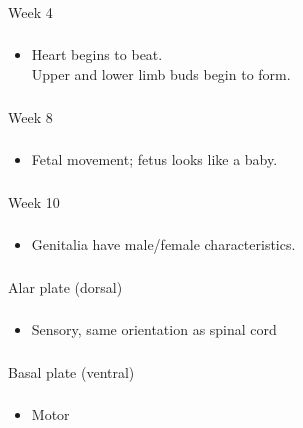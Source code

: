 \documentclass[11pt]{beamer}
\begin{document}
\begin{frame}
 \frametitle{}
Week 4
\end{frame}

\begin{frame}
 \frametitle{}
\begin{itemize}
\item{Heart begins to beat. \\ Upper and lower limb buds begin to form.}
\end{itemize}
\end{frame}

\begin{frame}
 \frametitle{}
Week 8
\end{frame}

\begin{frame}
 \frametitle{}
\begin{itemize}
\item{Fetal movement; fetus looks like a baby.}
\end{itemize}
\end{frame}

\begin{frame}
 \frametitle{}
Week 10
\end{frame}

\begin{frame}
 \frametitle{}
\begin{itemize}
\item{Genitalia have male/female characteristics.}
\end{itemize}
\end{frame}

\begin{frame}
 \frametitle{}
Alar plate (dorsal)
\end{frame}

\begin{frame}
 \frametitle{}
\begin{itemize}
\item{Sensory, same orientation as spinal cord }
\end{itemize}
\end{frame}

\begin{frame}
 \frametitle{}
Basal plate (ventral)
\end{frame}

\begin{frame}
 \frametitle{}
\begin{itemize}
\item{Motor}
\end{itemize}
\end{frame}
\end{document}
